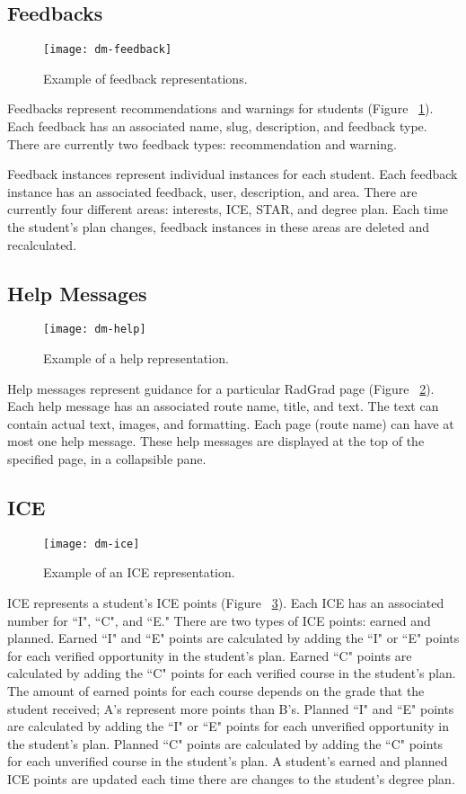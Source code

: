\subsection{Feedbacks}
\begin{figure}[htbp!]
\centering
\texttt{[image: dm-feedback]}
\caption{Example of feedback representations.}
\label{feedback}
\end{figure}
Feedbacks represent recommendations and warnings for students (Figure ~\ref{feedback}). Each feedback has an associated name, slug, description, and feedback type. There are currently two feedback types: recommendation and warning. 

Feedback instances represent individual instances for each student. Each feedback instance has an associated feedback, user, description, and area. There are currently four different areas: interests, ICE, STAR, and degree plan. Each time the student's plan changes, feedback instances in these areas are deleted and recalculated.

\subsection{Help Messages}
\begin{figure}[htbp!]
\centering
\texttt{[image: dm-help]}
\caption{Example of a help representation.}
\label{help}
\end{figure}
Help messages represent guidance for a particular RadGrad page (Figure ~\ref{help}). Each help message has an associated route name, title, and text. The text can contain actual text, images, and formatting. Each page (route name) can have at most one help message. These help messages are displayed at the top of the specified page, in a collapsible pane.  

\subsection{ICE}
\begin{figure}[htbp!]
\centering
\texttt{[image: dm-ice]}
\caption{Example of an ICE representation.}
\label{ice}
\end{figure}
ICE represents a student's ICE points (Figure ~\ref{ice}). Each ICE has an associated number for ``I", ``C", and ``E." There are two types of ICE points: earned and planned. Earned ``I" and ``E" points are calculated by adding the ``I" or ``E" points for each verified opportunity in the student's plan. Earned ``C" points are calculated by adding the ``C" points for each verified course in the student's plan. The amount of earned points for each course depends on the grade that the student received; A's represent more points than B's. Planned ``I" and ``E" points are calculated by adding the ``I" or ``E" points for each unverified opportunity in the student's plan. Planned ``C" points are calculated by adding the ``C" points for each unverified course in the student's plan. A student's earned and planned ICE points are updated each time there are changes to the student's degree plan. 

